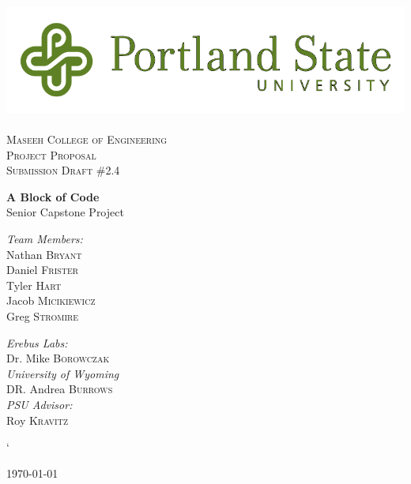 
\usepackage{pstricks}
\linespread{1.1}

\begin{titlepage}
\begin{center}

\includegraphics[width=.75\textwidth]{./PSU_logo.png}~\\[.5cm]

\textsc{\LARGE \color{PSU} Maseeh College of Engineering}\\[1.5cm]

\textsc{\Large Project Proposal}\\[0.5cm]
\textsc{\Large Submission Draft \#2.4}\\[0.5cm]
\vspace{1cm}

{ \huge \bfseries\color{PSU} A Block of Code\\[0.4cm] }
  \large Senior Capstone Project

\vspace{2.5cm}
 \begin{multicols}{2}

\begin{flushleft}
\noindent
 \large
\emph{\color{PSU}Team Members:}\\
Nathan \textsc{Bryant}\\
Daniel \textsc{Frister}\\
Tyler  \textsc{Hart}\\
Jacob   \textsc{Micikiewicz}\\
Greg    \textsc{Stromire}\\
\end{flushleft}

 \begin{flushleft}
  \large
 \emph{\color{PSU}Erebus Labs:} \\
 Dr. Mike  \textsc{Borowczak}\\
 \emph{\color{PSU}University of Wyoming}\\
 DR. Andrea \textsc{Burrows}\\
 \emph{\color{PSU}PSU Advisor:}\\
 Roy \textsc{Kravitz}
 \end{flushleft}


 \end{multicols}`
\vfill

{\large \today}

\end{center}
\end{titlepage}
 \tableofcontents

